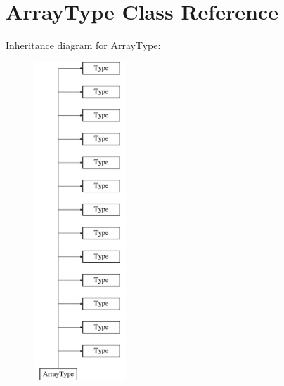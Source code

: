 \hypertarget{classArrayType}{\section{Array\-Type Class Reference}
\label{classArrayType}
}
Inheritance diagram for Array\-Type\-:\begin{figure}[H]
\begin{center}
\leavevmode
\includegraphics[height=12.000000cm]{classArrayType}
\end{center}
\end{figure}
